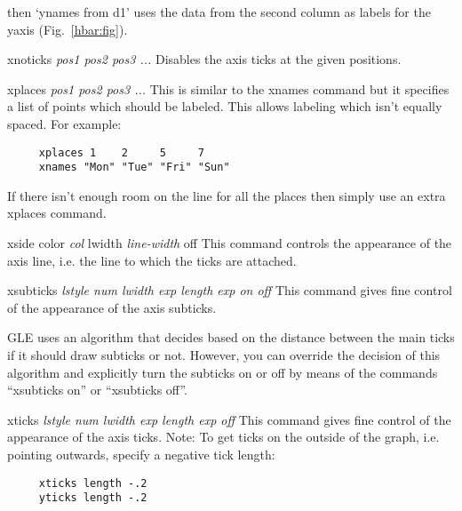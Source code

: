 \begin{commanddescription}
\noindent{}then `{\sf ynames from d1}' uses the data from the second column as labels for the yaxis (Fig.~\ref{hbar:fig}).

\item[{\sf xnoticks {\it pos1 pos2 pos3 ...}}]
Disables the axis ticks at the given positions.

\item[{\sf xplaces {\it pos1 pos2 pos3 ...}}  ]
This is similar to the xnames command but it specifies a list of points
which should be labeled.  This allows labeling which isn't equally
spaced. For example:

\begin{Verbatim}
     xplaces 1    2     5     7
     xnames "Mon" "Tue" "Fri" "Sun"
\end{Verbatim}

If there isn't enough room on the line for all the places then simply
use an extra {\sf xplaces} command.

\item[{\sf xside color {\it col} lwidth {\it line-width} off  } ]
This command controls the appearance of the axis line, i.e. the line
to which the ticks are attached.

\item[{\sf xsubticks {\it {\sf lstyle} num  {\sf lwidth} exp {\sf length} exp  {\sf on} {\sf off}}} ]
This command gives fine control of the appearance of the axis subticks.

GLE uses an algorithm that decides based on the distance between the main ticks if it should draw subticks or not. However, you can override the decision of this algorithm and explicitly turn the subticks on or off by means of the commands ``xsubticks on'' or ``xsubticks off''.

\item[{\sf xticks {\it {\sf lstyle} num {\sf lwidth} exp {\sf length} exp {\sf off}}} ]
This command gives fine control of the appearance of the axis ticks.
Note: To get ticks on the outside of the graph, i.e. pointing outwards,
specify a negative tick length:

\preglecode{}
\begin{Verbatim}
     xticks length -.2
     yticks length -.2
\end{Verbatim}
\postglecode{}


\end{commanddescription}
